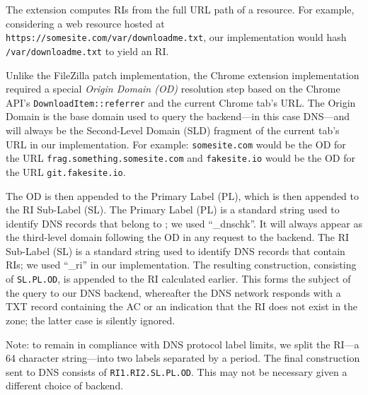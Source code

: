 The extension computes RIs from the full URL path of a resource. For example,
considering a web resource hosted at
\texttt{https://somesite.com/var/downloadme.txt}, our implementation would hash
\texttt{/var/downloadme.txt} to yield an RI.

Unlike the FileZilla patch implementation, the Chrome extension implementation
required a special \emph{Origin Domain (OD)} resolution step based on the Chrome
API's \texttt{DownloadItem::referrer} and the current Chrome tab's URL. The
Origin Domain is the base domain used to query the backend---in this case
DNS---and will always be the Second-Level Domain (SLD) fragment of the current
tab's URL in our implementation. For example: \texttt{somesite.com} would be the
OD for the URL \texttt{frag.something.somesite.com} and \texttt{fakesite.io}
would be the OD for the URL \texttt{git.fakesite.io}.

The OD is then appended to the Primary Label (PL), which is then appended to the
RI Sub-Label (SL). The Primary Label (PL) is a standard string used to identify
DNS records that belong to \SYSTEM{}; we used ``\_dnschk''. It will always
appear as the third-level domain following the OD in any request to the backend. The
RI Sub-Label (SL) is a standard string used to identify DNS records that contain
RIs; we used ``\_ri'' in our implementation. The resulting construction,
consisting of \texttt{SL.PL.OD}, is appended to the RI calculated earlier. This
forms the subject of the query to our DNS backend, whereafter the DNS network
responds with a TXT record containing the AC or an indication that the RI does
not exist in the zone; the latter case is silently ignored.

Note: to remain in compliance with DNS protocol label limits, we split the
RI---a 64 character string---into two labels separated by a period. The final
construction sent to DNS consists of \texttt{RI1.RI2.SL.PL.OD}. This may not be
necessary given a different choice of backend.

